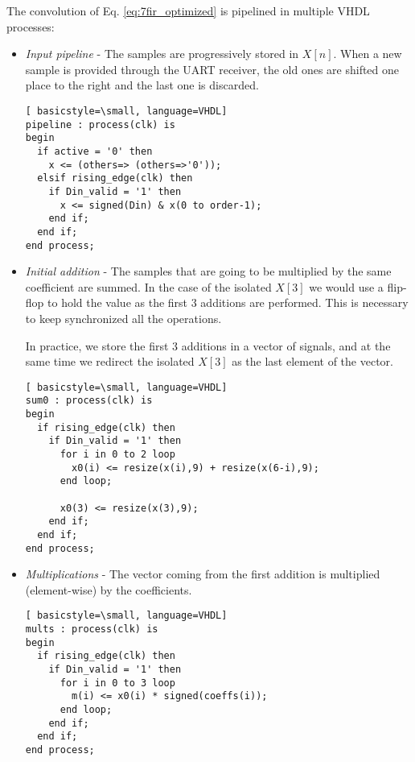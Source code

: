 The convolution of Eq. \ref{eq:7fir_optimized} is pipelined in multiple VHDL processes:
\begin{itemize}


    \item \emph{Input pipeline} - The samples are progressively stored in $X[n]$. When a new sample is provided through the UART receiver, the old ones are shifted one place to the right and the last one is discarded.
    \newpage
\begin{lstlisting}[ basicstyle=\small, language=VHDL]
pipeline : process(clk) is
begin
  if active = '0' then
    x <= (others=> (others=>'0'));
  elsif rising_edge(clk) then
    if Din_valid = '1' then
      x <= signed(Din) & x(0 to order-1);
    end if;
  end if;
end process;
\end{lstlisting}
    
    
    \item \emph{Initial addition} - The samples that are going to be multiplied by the same coefficient are summed. In the case of the isolated $X[3]$ we would use a flip-flop to hold the value as the first 3 additions are performed. This is necessary to keep synchronized all the operations. 
    
    In practice, we store the first 3 additions in a vector of signals, and at the same time we redirect the isolated $X[3]$ as the last element of the vector.
    
\begin{lstlisting}[ basicstyle=\small, language=VHDL]
sum0 : process(clk) is
begin        
  if rising_edge(clk) then
    if Din_valid = '1' then
      for i in 0 to 2 loop
        x0(i) <= resize(x(i),9) + resize(x(6-i),9);
      end loop;
           
      x0(3) <= resize(x(3),9);
    end if;
  end if;
end process;
\end{lstlisting}
    
    
    \item \emph{Multiplications} - The vector coming from the first addition is multiplied (element-wise) by the coefficients.
    
\begin{lstlisting}[ basicstyle=\small, language=VHDL]
mults : process(clk) is
begin
  if rising_edge(clk) then
    if Din_valid = '1' then
      for i in 0 to 3 loop
        m(i) <= x0(i) * signed(coeffs(i));
      end loop;
    end if;         
  end if;
end process;
\end{lstlisting}



\end{itemize}
